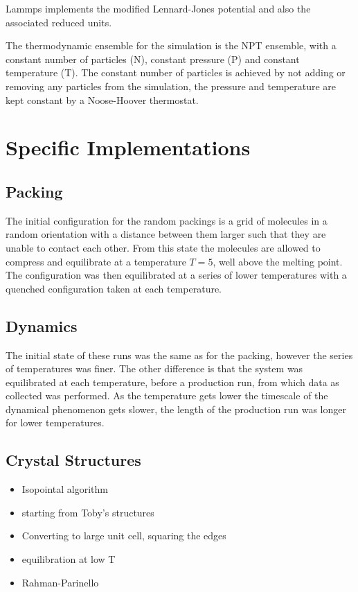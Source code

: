 Lammps implements the modified Lennard-Jones potential and also the associated reduced units.

The thermodynamic ensemble for the simulation is the NPT ensemble, with a constant number of particles (N), constant pressure (P) and constant temperature (T). The constant number of particles is achieved by not adding or removing any particles from the simulation, the pressure and temperature are kept constant by a Noose-Hoover thermostat\tocheck.


\section{Specific Implementations}

\subsection{Packing}

The initial configuration for the random packings is a grid of molecules in a random orientation with a distance between them larger such that they are unable to contact each other. From this state the molecules are allowed to compress and equilibrate at a temperature $T=5$, well above the melting point. The configuration was then equilibrated at a series of lower temperatures with a quenched configuration taken at each temperature.

\subsection{Dynamics}

The initial state of these runs was the same as for the packing, however the series of temperatures was finer. The other difference is that the system was equilibrated at each temperature, before a production run, from which data as collected was performed. As the temperature gets lower the timescale of the dynamical phenomenon gets slower, the length of the production run was longer for lower temperatures.

\subsection{Crystal Structures}

\begin{itemize}
    \item Isopointal algorithm
    \item starting from Toby's structures
    \item Converting to large unit cell, squaring the edges
    \item equilibration at low T
    \item Rahman-Parinello
\end{itemize}

